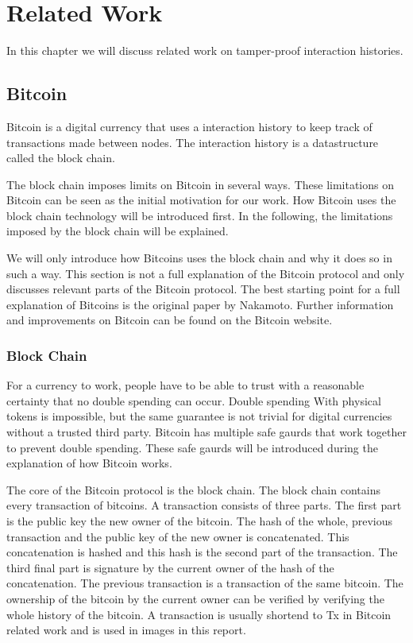 \chapter{Related Work}
In this chapter we will discuss related work on tamper-proof interaction histories.

\section{Bitcoin}
Bitcoin is a digital currency that uses a interaction history 
to keep track of transactions made between nodes.
The interaction history is a datastructure called the block chain.

The block chain imposes limits on Bitcoin in several ways.
These limitations on Bitcoin can be seen as the initial motivation for our work.
How Bitcoin uses the block chain technology will be introduced first.
In the following, the limitations imposed by the block chain will be explained.

We will only introduce how Bitcoins uses the block chain and why it does so in such a way.
This section is not a full explanation of the Bitcoin protocol
and only discusses relevant parts of the Bitcoin protocol.
The best starting point for a full explanation of Bitcoins 
is the original paper by Nakamoto\cite{Nakamoto-bitcoin}.
Further information and improvements on Bitcoin can be found on the Bitcoin website\cite{Bitcoin.org-site}.

\subsection{Block Chain}
For a currency to work, people have to be able to trust with a reasonable certainty that no double spending can occur.
Double spending With physical tokens is impossible,
but the same guarantee is not trivial for digital currencies without a trusted third party.
Bitcoin has multiple safe gaurds that work together to prevent double spending.
These safe gaurds will be introduced during the explanation of how Bitcoin works.

The core of the Bitcoin protocol is the block chain.
The block chain contains every transaction of bitcoins.
A transaction consists of three parts.
The first part is the public key the new owner of the bitcoin.
The hash of the whole, previous transaction and the public key of the new owner is concatenated.
This concatenation is hashed and this hash is the second part of the transaction.
The third final part is signature by the current owner of the hash of the concatenation.
The previous transaction is a transaction of the same bitcoin.
The ownership of the bitcoin by the current owner can be verified
by verifying the whole history of the bitcoin.
A transaction is usually shortend to Tx in Bitcoin related work and is used in images in this report.

